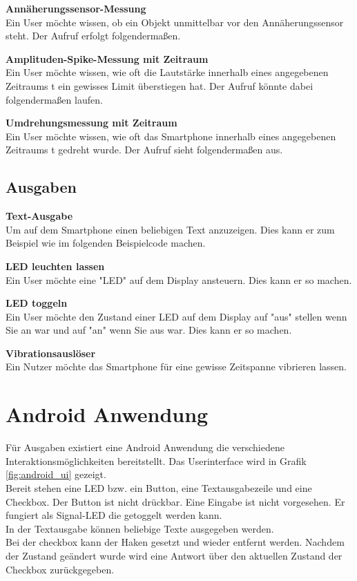 \documentclass[11pt,a4paper]{report}
\begin{document}
\textbf{Annäherungssensor-Messung}\\
Ein User möchte wissen, ob ein Objekt unmittelbar vor den Annäherungssensor steht.
Der Aufruf erfolgt folgendermaßen.


\textbf{Amplituden-Spike-Messung mit Zeitraum}\\
Ein User möchte wissen, wie oft die Lautstärke innerhalb eines angegebenen Zeitraums t ein gewisses Limit überstiegen hat.
Der Aufruf könnte dabei folgendermaßen laufen.



\textbf{Umdrehungsmessung mit Zeitraum}\\
Ein User möchte wissen, wie oft das Smartphone innerhalb eines angegebenen Zeitraums t gedreht wurde.
Der Aufruf sieht folgendermaßen aus.



\subsection*{Ausgaben}\label{subsec:Ausgaben}

\textbf{Text-Ausgabe}\\
Um auf dem Smartphone einen beliebigen Text anzuzeigen.
Dies kann er zum Beispiel wie im folgenden Beispielcode machen.


\textbf{LED leuchten lassen}\\
Ein User möchte eine "LED" auf dem Display ansteuern.
Dies kann er so machen.


\textbf{LED toggeln}\\
Ein User möchte den Zustand einer LED auf dem Display auf "aus" stellen wenn Sie an war und auf "an" wenn Sie aus war.
Dies kann er so machen.


\textbf{Vibrationsauslöser}\\
Ein Nutzer möchte das Smartphone für eine gewisse Zeitspanne vibrieren lassen.


\section{Android Anwendung}\label{sec:androidApp}
Für Ausgaben existiert eine Android Anwendung die verschiedene Interaktionsmöglichkeiten bereitstellt.
Das Userinterface wird in Grafik \ref{fig:android_ui} gezeigt.
\\
Bereit stehen eine LED bzw. ein Button, eine Textausgabezeile und eine Checkbox.
Der Button ist nicht drückbar.
Eine Eingabe ist nicht vorgesehen.
Er fungiert als Signal-LED die getoggelt werden kann.
\\
In der Textausgabe können beliebige Texte ausgegeben werden.
\\
Bei der checkbox kann der Haken gesetzt und wieder entfernt werden.
Nachdem der Zustand geändert wurde wird eine Antwort über den aktuellen Zustand der Checkbox zurückgegeben.
\end{document}

